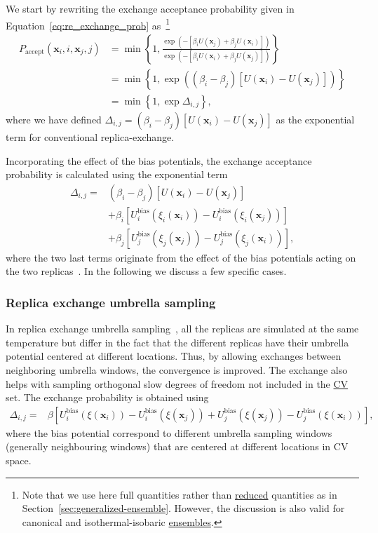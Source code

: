 \documentclass[9pt,review]{livecoms}
\newcommand{\vx}{\mathbf{x}}
\begin{document}
We start by rewriting the exchange acceptance probability given in Equation~\ref{eq:re_exchange_prob}
as~\footnote{Note that we use here full quantities rather than \hyperlink{ref:reduced} {reduced} quantities as in Section~\ref{sec:generalized-ensemble}. However, the discussion is also valid for canonical and isothermal-isobaric \hyperlink{ref:Ensemble} {ensembles}.}
\begin{align}
\label{eq:replexc_acceptance probability}
P_\mathrm{accept}(\vx_i, i, \vx_j, j) &=
\min\left\{1,\frac{\exp(-[\beta_{i}U(\vx_j)+\beta_{j}U(\vx_i)])}{\exp(-[\beta_{i}U(\vx_i)+\beta_{j}U(\vx_j)])}\right\}
\nonumber \\
&=
\min\left\{1,\exp\left(\left(\beta_{i} - \beta_{j}\right)
\left[U(\vx_{i}) - U(\vx_{j})\right]\right)\right\}
\nonumber \\
&=
\min\left\{1,\exp \Delta_{i,j}\right\},
\end{align}
where we have defined $\Delta_{i,j}=\left(\beta_{i} - \beta_{j}\right)
\left[U(\vx_{i}) - U(\vx_{j})\right]
$ as the exponential term for conventional replica-exchange.

Incorporating the effect of the bias potentials, the exchange acceptance probability is calculated using the exponential term
\begin{align}
\Delta_{i,j} = &
\left(\beta_{i} - \beta_{j}\right)
\left[U(\vx_{i}) - U(\vx_{j})\right]
\nonumber \\ & +
\beta_{i} \left[
U^{\mathrm{bias}}_{i}(\xi_{i}(\vx_{i})) - U^{\mathrm{bias}}_{i}(\xi_{i}(\vx_{j}))
\right]
\nonumber \\ & +
\beta_{j} \left[
U^{\mathrm{bias}}_{j}(\xi_{j}(\vx_{j})) - U^{\mathrm{bias}}_{j}(\xi_{j}(\vx_{i}))
\right],
\end{align}
where the two last terms originate from the effect of the bias potentials acting on the two replicas~\cite{Bussi-JACS-2006}. In the following we discuss a few specific cases.

\subsubsection{Replica exchange umbrella sampling}
\label{sec:repex_umbrsampl}
In replica exchange umbrella sampling~\cite{Sugita2000_REUS}, all the replicas are simulated at the same temperature but differ in the fact that the different replicas have their umbrella potential centered at different locations. Thus, by allowing exchanges between neighboring umbrella windows, the convergence is improved. The exchange also helps with sampling orthogonal slow degrees of freedom not included in the \hyperlink{ref:CV} {CV} set. The exchange probability is obtained using
\begin{align}
\Delta_{i,j} = &
\beta \left[
U^{\mathrm{bias}}_{i}(\xi(\vx_{i})) - U^{\mathrm{bias}}_{i}(\xi(\vx_{j})) +
U^{\mathrm{bias}}_{j}(\xi(\vx_{j})) - U^{\mathrm{bias}}_{j}(\xi(\vx_{i}))
\right],
\end{align}
where the bias potential correspond to different umbrella sampling windows (generally neighbouring windows) that are centered at different locations in CV space.
\end{document}
